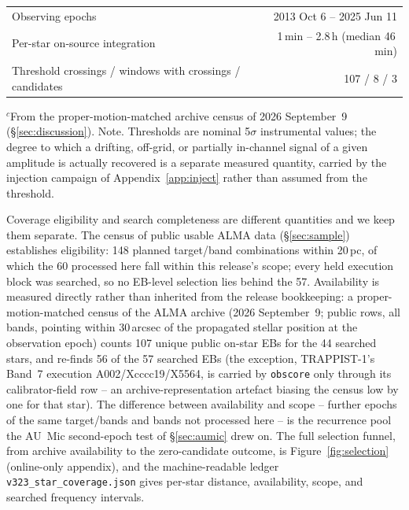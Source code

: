 \documentclass{openjournal}
\begin{document}
\begin{table}
\begin{tabular}{@{}l r@{}}
Observing epochs & 2013 Oct 6 -- 2025 Jun 11 \\
Per-star on-source integration & 1\,min -- 2.8\,h (median 46\,min) \\
Threshold crossings / windows with crossings / candidates & 107 / 8 / 3 \\
\hline
\end{tabular}
\par\vspace{3pt}
\parbox{\columnwidth}{\footnotesize $^{c}$From the proper-motion-matched
archive census of 2026 September~9 (\S\ref{sec:discussion}). Note.
Thresholds are nominal
5$\sigma$ instrumental values; the degree to which a drifting,
off-grid, or partially in-channel signal of a given amplitude is
actually recovered is a separate measured quantity, carried by the
injection campaign of Appendix~\ref{app:inject} rather than assumed
from the threshold.}
\end{table}


Coverage eligibility and search completeness are different quantities
and we keep them separate. The census of public usable ALMA data
(\S\ref{sec:sample}) establishes eligibility: 148 planned target/band
combinations within 20\,pc, of which the 60 processed here fall
within this release's scope; every held execution block was searched,
so no EB-level selection lies behind the 57. Availability is
measured directly rather than inherited from the release bookkeeping:
a proper-motion-matched census of the ALMA archive (2026
September~9; public rows, all bands, pointing within 30\,arcsec of
the propagated stellar position at the observation epoch) counts 107
unique public on-star EBs for the 44 searched stars, and re-finds 56
of the 57 searched EBs (the exception, TRAPPIST-1's Band~7 execution
A002/Xcccc19/X5564, is carried by \texttt{obscore} only through its
calibrator-field row -- an archive-representation artefact biasing
the census low by one for that star). The difference between
availability and scope -- further epochs of the same target/bands and
bands not processed here -- is the recurrence pool the AU~Mic
second-epoch test of \S\ref{sec:aumic} drew on. The full selection
funnel, from archive availability to the zero-candidate outcome, is
Figure~\ref{fig:selection} (online-only appendix), and the
machine-readable ledger \texttt{v323\_star\_coverage.json} gives
per-star distance, availability, scope, and searched frequency
intervals.
\end{document}
